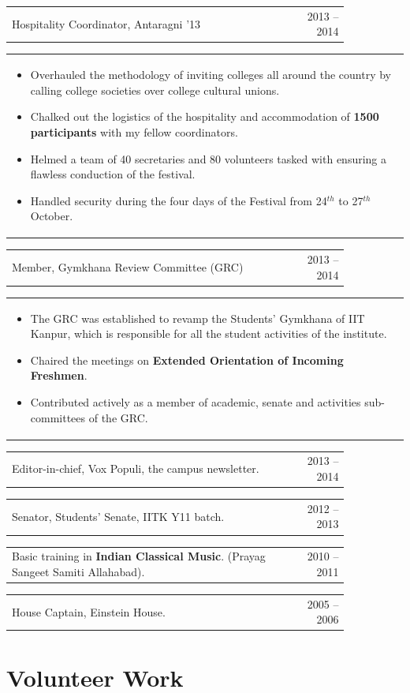 \documentclass[a4paper,10pt]{article} %
\newcommand{\iproject}[3]{
    \begin{tabular}{p{0.85\linewidth}r}
        \textcolor{NavyBlue}{#2} & \multicolumn{1}{m{3cm}}{\raggedleft \textsc{#1}}\\
    \end{tabular}
    \begin{tabular}{p{\linewidth}}
    \vspace{-0.3cm}
        \footnotesize{#3}
    \end{tabular}
    \vspace{-0.5cm}
}
\newcommand{\skill}[2]{
    \begin{tabular}{p{0.85\linewidth}r}
        #2 & \multicolumn{1}{m{3cm}}{\raggedleft \textsc{#1}}\\
    \end{tabular}
    \vspace{-0.5cm}
}
\begin{document}
\iproject {2013 -- 2014}
          {Hospitality Coordinator, Antaragni '13}
          {
               \begin{itemize}[leftmargin=0.5cm]
                   \item Overhauled the methodology of inviting colleges all around the country by calling college societies over college cultural unions.
                   \item Chalked out the logistics of the hospitality and accommodation of \textbf{1500 participants} with my fellow coordinators.
                   \item Helmed a team of 40 secretaries and 80 volunteers tasked with ensuring a flawless conduction of the festival.
                   \item Handled security during the four days of the Festival from 24$^{th}$ to 27$^{th}$ October.
               \end{itemize}
          }

\iproject {2013 -- 2014}
          {Member, Gymkhana Review Committee (GRC)}
          {
               \begin{itemize}[leftmargin=0.5cm]
                   \item The GRC was established to revamp the Students' Gymkhana of IIT Kanpur,
                       which is responsible for all the student activities of the institute.
                   \item Chaired the meetings on \textbf{Extended Orientation of Incoming Freshmen}.
                   \item Contributed actively as a member of academic, senate and activities sub-committees of the GRC.
               \end{itemize}
          }

\skill {2013 -- 2014}
       {Editor-in-chief, Vox Populi, the campus newsletter.}

\skill {2012 -- 2013}
       {Senator, Students' Senate, IITK Y11 batch.}

\skill {2010 -- 2011}
       {Basic training in \textbf{Indian Classical Music}. (Prayag Sangeet Samiti Allahabad).}

\skill {2005 -- 2006}
       {House Captain, Einstein House.}


\section{Volunteer Work}
\end{document}
